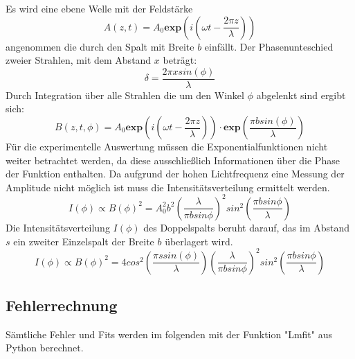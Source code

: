 Es wird eine ebene Welle mit der Feldstärke
\begin{equation}
  A(z,t)= A_0 \textbf{exp} \left(i \left( \omega t - \frac{2 \pi z}{\lambda}   \right) \right)
  \label{eqn:welle}
\end{equation}
angenommen die durch den Spalt mit Breite $b$ einfällt. Der Phasenunteschied zweier Strahlen, mit dem Abstand $x$ beträgt:
\begin{equation}
  \delta = \frac{2 \pi x sin(\phi)}{\lambda}
  \label{eqn:phase}
\end{equation}
Durch Integration über alle Strahlen die um den Winkel $\phi$ abgelenkt sind ergibt sich:
\begin{equation}
  B(z,t,\phi) = A_0 \textbf{exp} \left( i \left( \omega t - \frac{2 \pi z}{\lambda} \right) \right) \cdot \textbf{exp} \left( \frac{\pi b sin(\phi)}{\lambda} \right)
  \label{}
\end{equation}
Für die experimentelle Auswertung müssen die Exponentialfunktionen nicht weiter betrachtet werden, da diese ausschließlich Informationen über die Phase der Funktion enthalten. Da aufgrund der hohen Lichtfrequenz eine Messung der Amplitude nicht möglich ist muss die Intensitätsverteilung ermittelt werden.
\begin{equation}
  I(\phi) \propto B(\phi)^2 = A_0^2 b^2 \left( \frac{\lambda}{\pi b sin \phi} \right)^2 sin^2 \left( \frac{\pi b sin \phi}{\lambda} \right)
  \label{eqn:I}
\end{equation}
Die Intensitätsverteilung $I(\phi)$ des Doppelspalts beruht darauf, das im Abstand $s$ ein zweiter Einzelspalt der Breite $b$ überlagert wird.
\begin{equation}
  I(\phi) \propto B(\phi)^2 = 4cos^2\left( \frac{\pi s sin(\phi)}{\lambda} \right) \left( \frac{\lambda}{\pi b sin \phi} \right)^2 sin^2 \left( \frac{\pi b sin \phi}{\lambda} \right)
  \label{eqn:Id}
\end{equation}

\subsection{Fehlerrechnung}
Sämtliche Fehler und Fits werden im folgenden mit der Funktion "Lmfit" aus Python berechnet.
